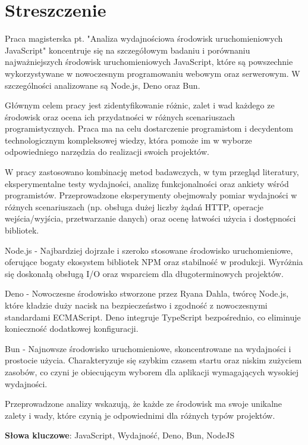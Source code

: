 \section*{Streszczenie}
Praca magisterska pt. "Analiza wydajnościowa środowisk uruchomieniowych JavaScript" koncentruje się na szczegółowym badaniu i porównaniu najważniejszych środowisk uruchomieniowych JavaScript, które są powszechnie wykorzystywane w nowoczesnym programowaniu webowym oraz serwerowym. W szczególności analizowane są Node.js, Deno oraz Bun.

Głównym celem pracy jest zidentyfikowanie różnic, zalet i wad każdego ze środowisk oraz ocena ich przydatności w różnych scenariuszach programistycznych. Praca ma na celu dostarczenie programistom i decydentom technologicznym kompleksowej wiedzy, która pomoże im w wyborze odpowiedniego narzędzia do realizacji swoich projektów.

W pracy zastosowano kombinację metod badawczych, w tym przegląd literatury, eksperymentalne testy wydajności, analizę funkcjonalności oraz ankiety wśród programistów. Przeprowadzone eksperymenty obejmowały pomiar wydajności w różnych scenariuszach (np. obsługa dużej liczby żądań HTTP, operacje wejścia/wyjścia, przetwarzanie danych) oraz ocenę łatwości użycia i dostępności bibliotek.

Node.js - Najbardziej dojrzałe i szeroko stosowane środowisko uruchomieniowe, oferujące bogaty ekosystem bibliotek NPM oraz stabilność w produkcji. Wyróżnia się doskonałą obsługą I/O oraz wsparciem dla długoterminowych projektów.

Deno - Nowoczesne środowisko stworzone przez Ryana Dahla, twórcę Node.js, które kładzie duży nacisk na bezpieczeństwo i zgodność z nowoczesnymi standardami ECMAScript. Deno integruje TypeScript bezpośrednio, co eliminuje konieczność dodatkowej konfiguracji.

Bun - Najnowsze środowisko uruchomieniowe, skoncentrowane na wydajności i prostocie użycia. Charakteryzuje się szybkim czasem startu oraz niskim zużyciem zasobów, co czyni je obiecującym wyborem dla aplikacji wymagających wysokiej wydajności.

Przeprowadzone analizy wskazują, że każde ze środowisk ma swoje unikalne zalety i wady, które czynią je odpowiednimi dla różnych typów projektów.

\bigskip

\textbf{Słowa kluczowe}: JavaScript, Wydajność, Deno, Bun, NodeJS
\newpage

